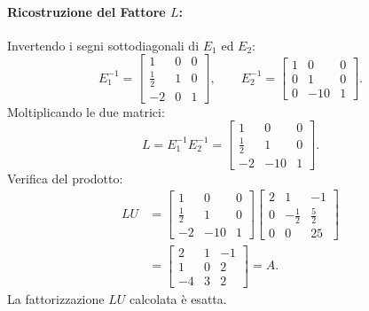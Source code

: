 \paragraph{Ricostruzione del Fattore $L$:}
Invertendo i segni sottodiagonali di $E_1$ ed $E_2$:
\begin{equation}
    E_1^{-1} = \begin{bmatrix}
        1 & 0 & 0 \\
        \frac{1}{2} & 1 & 0 \\
        -2 & 0 & 1
    \end{bmatrix}, \qquad
    E_2^{-1} = \begin{bmatrix}
        1 & 0 & 0 \\
        0 & 1 & 0 \\
        0 & -10 & 1
    \end{bmatrix}.
\end{equation}
Moltiplicando le due matrici:
\begin{equation}
    L = E_1^{-1} E_2^{-1} = \begin{bmatrix}
        1 & 0 & 0 \\
        \frac{1}{2} & 1 & 0 \\
        -2 & -10 & 1
    \end{bmatrix}.
\end{equation}
Verifica del prodotto:
\begin{align}
    LU &= \begin{bmatrix}
        1 & 0 & 0 \\
        \frac{1}{2} & 1 & 0 \\
        -2 & -10 & 1
    \end{bmatrix}
    \begin{bmatrix}
        2 & 1 & -1 \\
        0 & -\frac{1}{2} & \frac{5}{2} \\
        0 & 0 & 25
    \end{bmatrix} \nonumber \\
    &= \begin{bmatrix}
        2 & 1 & -1 \\
        1 & 0 & 2 \\
        -4 & 3 & 2
    \end{bmatrix} = A.
\end{align}
La fattorizzazione $LU$ calcolata \`e esatta.

